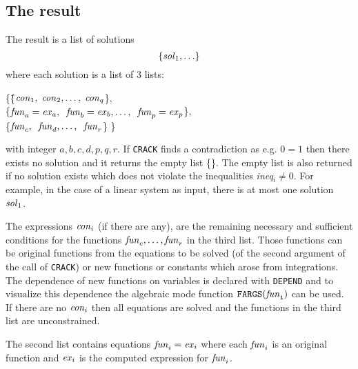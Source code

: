 \subsection{The result}
The result is a list of solutions
\[      \{{\it sol}_1, \ldots \}  \]
where each solution is a list of 3 lists:
\begin{tabbing}
       \{\=\{${\it con}_1, \; {\it con}_2, \ldots , \; {\it con}_q$\}, \\
         \>\{${\it fun}_a={\it ex}_a, \;\;
{\it fun}_b={\it ex}_b, \ldots , \;\; {\it fun}_p={\it ex}_p$\},\=  \\
         \>\{${\it fun}_c, \;\; {\it fun}_d, \ldots , \;\; {\it fun}_r$\} \>\}
\end{tabbing}
with integer $a, b, c, d, p, q, r.$
If {\tt CRACK} finds a contradiction as e.g. $0=1$ then there exists no
solution and it returns the empty list \{\}.
The empty list is also returned if no solution exists
which does not violate the inequalities
{\it ineq}$_i \neq 0.$
For example, in the case of a linear system as input, there is
at most one solution ${\it sol}_1$.

The expressions ${\it con}_i$ (if there are any), are the
remaining necessary and sufficient conditions for the functions
${\it fun}_c,\ldots,{\it fun}_r$ in the third list.  Those
functions can be original functions from the equations to be
solved (of the second argument of the call of {\tt CRACK}) or new
functions or constants which arose from integrations.
The dependence of new functions on variables is declared with {\tt DEPEND}
and to visualize this dependence the algebraic mode function
${\tt FARGS({\it fun}_i)}$ can be used.
If there are no ${\it con}_i$ then all equations are solved and the
functions in the third list are unconstrained.

The second list contains
equations ${\it fun}_i={\it ex}_i$ where each ${\it fun}_i$ is an
original function and ${\it ex}_i$ is the computed expression
for ${\it fun}_i$.

